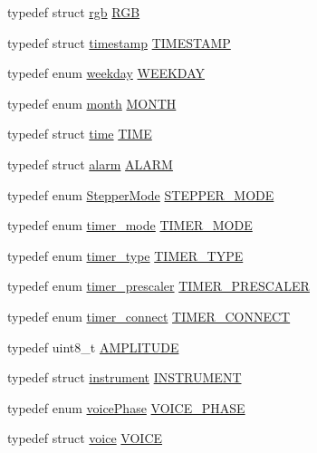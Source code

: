 \begin{DoxyCompactItemize}
\item 
typedef struct \hyperlink{structmhvlib_1_1rgb}{rgb} \hyperlink{namespacemhvlib_a21a85335ab93f04553238845c70477b1}{R\-G\-B}
\item 
typedef struct \hyperlink{structmhvlib_1_1timestamp}{timestamp} \hyperlink{namespacemhvlib_ae0658d1591e8aabca3a4b259a0c483cd}{T\-I\-M\-E\-S\-T\-A\-M\-P}
\item 
typedef enum \hyperlink{namespacemhvlib_a6cac32785175aa632dedf0f231f4b2d5}{weekday} \hyperlink{namespacemhvlib_ade7995baadfb86fecbbbe6f8d624db9c}{W\-E\-E\-K\-D\-A\-Y}
\item 
typedef enum \hyperlink{namespacemhvlib_ab6dc87074774414e8c185a46c7db18c3}{month} \hyperlink{namespacemhvlib_a2406fef93804eb87fef77054c6a2082c}{M\-O\-N\-T\-H}
\item 
typedef struct \hyperlink{structmhvlib_1_1time}{time} \hyperlink{namespacemhvlib_ae8a0c3208996dd45e613708c01cbc83c}{T\-I\-M\-E}
\item 
typedef struct \hyperlink{structmhvlib_1_1alarm}{alarm} \hyperlink{namespacemhvlib_a3fa96bbaa152dfe112dd50663d5caef5}{A\-L\-A\-R\-M}
\item 
typedef enum \hyperlink{namespacemhvlib_a0fe223804f5109165f47cc1b1a52ca61}{Stepper\-Mode} \hyperlink{namespacemhvlib_ad1aeef32aeba87603b8d8a0ef14088b9}{S\-T\-E\-P\-P\-E\-R\-\_\-\-M\-O\-D\-E}
\item 
typedef enum \hyperlink{namespacemhvlib_a469ae797645536ad6a46c129233a9f45}{timer\-\_\-mode} \hyperlink{namespacemhvlib_a7e3e41da5cee0e53606cd51fe2cd2dc7}{T\-I\-M\-E\-R\-\_\-\-M\-O\-D\-E}
\item 
typedef enum \hyperlink{namespacemhvlib_af9698df07d406d27bd41ad19b2cd15e5}{timer\-\_\-type} \hyperlink{namespacemhvlib_a52fce76188d4cfd21a4af570cf2db41d}{T\-I\-M\-E\-R\-\_\-\-T\-Y\-P\-E}
\item 
typedef enum \hyperlink{namespacemhvlib_aef19ff50231eab9355114c5bc20ffead}{timer\-\_\-prescaler} \hyperlink{namespacemhvlib_ae280d2a7103fc576dbd0e8880c574e6c}{T\-I\-M\-E\-R\-\_\-\-P\-R\-E\-S\-C\-A\-L\-E\-R}
\item 
typedef enum \hyperlink{namespacemhvlib_a7e39bb40dc675c17881291836cf5ba88}{timer\-\_\-connect} \hyperlink{namespacemhvlib_a670ebf781e5447de855e589e9100e224}{T\-I\-M\-E\-R\-\_\-\-C\-O\-N\-N\-E\-C\-T}
\item 
typedef uint8\-\_\-t \hyperlink{namespacemhvlib_a15ca117fe572109e56c947a4c6612e7e}{A\-M\-P\-L\-I\-T\-U\-D\-E}
\item 
typedef struct \hyperlink{structmhvlib_1_1instrument}{instrument} \hyperlink{namespacemhvlib_abe46c8922ff2f901a0a36e388bb411bc}{I\-N\-S\-T\-R\-U\-M\-E\-N\-T}
\item 
typedef enum \hyperlink{namespacemhvlib_a50ab5665b5289a34c67c9402c3e5e2db}{voice\-Phase} \hyperlink{namespacemhvlib_aa0be04640f7d224bfc226bca5561dd80}{V\-O\-I\-C\-E\-\_\-\-P\-H\-A\-S\-E}
\item 
typedef struct \hyperlink{structmhvlib_1_1voice}{voice} \hyperlink{namespacemhvlib_a30dd69204107a88716243d57489dc5bc}{V\-O\-I\-C\-E}
\end{DoxyCompactItemize}

